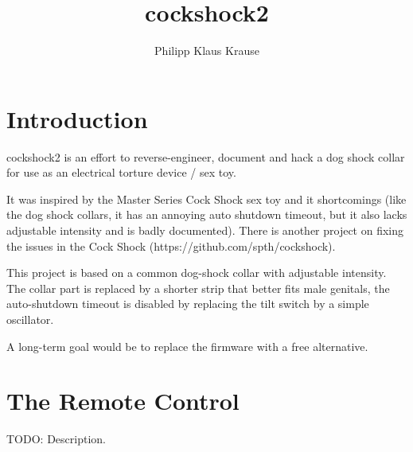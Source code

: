 \documentclass[a4paper]{article}
\begin{document}
\title{cockshock2}
\author{Philipp Klaus Krause}

\maketitle

\section{Introduction}

cockshock2 is an effort to reverse-engineer, document and hack a dog shock collar for use as an electrical torture device / sex toy.

It was inspired by the Master Series Cock Shock sex toy and it shortcomings (like the dog shock collars, it has an annoying auto shutdown timeout, but it also lacks adjustable intensity and is badly documented). There is another project on fixing the issues in the Cock Shock (https://github.com/spth/cockshock).

This project is based on a common dog-shock collar with adjustable intensity. The collar part is replaced by a shorter strip that better fits male genitals, the auto-shutdown timeout is disabled by replacing the tilt switch by a simple oscillator.

A long-term goal would be to replace the firmware with a free alternative.

\section{The Remote Control}

TODO: Description.
\end{document}

